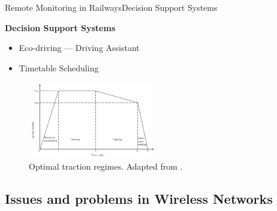 \begin{frame}{Remote Monitoring in Railways}{Decision Support Systems}
\begin{block}{\textbf{Decision Support Systems}}
	
	\begin{minipage}[t]{0.48\linewidth}
		\begin{itemize}
			\item Eco-driving --- Driving Assistant
			\item Timetable Scheduling
		\end{itemize}
	\end{minipage}\hfill
	\begin{minipage}[t]{0.48\linewidth}
		
		\begin{figure}[ht!]
			\centering
			\includegraphics[width=0.5\textwidth,keepaspectratio]{figures/35.DSS/scheepmaker2017a}
			\caption{Optimal traction regimes. Adapted from \cite{scheepmaker2017}.}
		\end{figure}
		
	\end{minipage}

\end{block}
\end{frame}

\subsection{Issues and problems in Wireless Networks}


